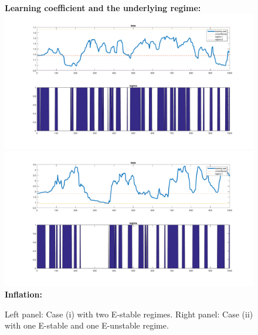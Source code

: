 \documentclass[12pt,reqno]{article}
\numberwithin{equation}{section}
\begin{document}
\begin{figure}[H]
\label{fisher_simul}
\caption{Left panel: Case (i) with two E-stable regimes. Right panel: Case (ii) with one E-stable and one E-unstable regime. }

\textbf{Learning coefficient and the underlying regime: } \\

\includegraphics[scale=0.2]{fisher_simulation1_learningCoef.pdf} 
\includegraphics[scale=0.2]{fisher_simulation2_learningCoef.pdf} \\


\textbf{Inflation:} \\


\end{figure}
\end{document}
